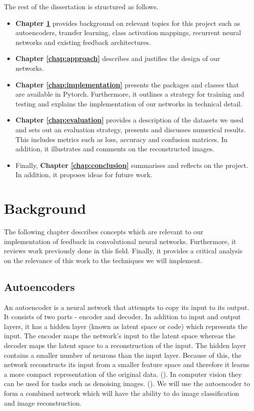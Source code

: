 \documentclass{l4proj}
\begin{document}
The rest of the dissertation is structured as follows.
\begin{itemize}
    \item \textbf{Chapter \ref{chap:background}} provides background on relevant topics for this project such as autoencoders, transfer learning, class activation mappings, recurrent neural networks and existing feedback architectures.
    \item \textbf{Chapter \ref{chap:approach}} describes and justifies the design of our networks.
    \item \textbf{Chapter \ref{chap:implementation}} presents the packages and classes that are available in Pytorch. Furthermore, it outlines a strategy for training and testing and explains the implementation of our networks in technical detail.
    \item \textbf{Chapter \ref{chap:evaluation}}  provides a description of the datasets we used and sets out an evaluation strategy, presents and discusses numerical results. This includes metrics such as loss, accuracy and confusion matrices. In addition, it illustrates and comments on the reconstructed images.
    \item Finally, \textbf{Chapter \ref{chap:conclusion}} summarises and reflects on the project. In addition, it proposes ideas for future work.
\end{itemize}
 
\chapter{Background}
\label{chap:background}

The following chapter describes concepts which are relevant to our implementation of feedback in convolutional neural networks. Furthermore, it reviews work previously done in this field. Finally, it provides a critical analysis on the relevance of this work to the techniques we will implement.

\section{Autoencoders}
An autoencoder is a neural network that attempts to copy its input to its output. It consists of two parts - encoder and decoder. In addition to input and output layers, it has a hidden layer (known as latent space or code) which represents the input. The encoder maps the network's input to the latent space whereas the decoder maps the latent space to a reconstruction of the input. The hidden layer contains a smaller number of neurons than the input layer. Because of this, the network reconstructs its input from a smaller feature space and therefore it learns a more compact representation of the original data. (\cite{deeplearning}). In computer vision they can be used for tasks such as denoising images. (\cite{denoising}).
We will use the autoencoder to form a combined network which will have the ability to do image classification and image reconstruction.
\end{document}
